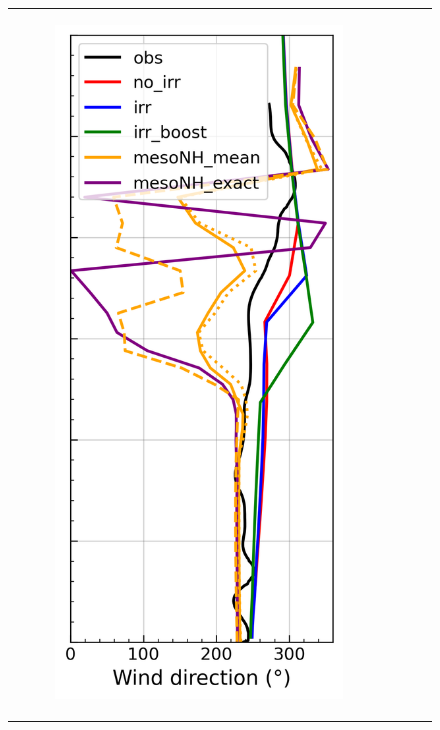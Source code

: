 \begin{figure}[hbtp]
{\begin{tabular}{@{}cccc@{}}
\begin{subfigure}[t]{0.283\textwidth}
            \caption{}
            \includegraphics[width=\textwidth]{images/chap6/profiles/profile_cendrosa_wind_direction_1507_sensbins.png}

\end{subfigure}
\end{tabular}}
\end{figure}
